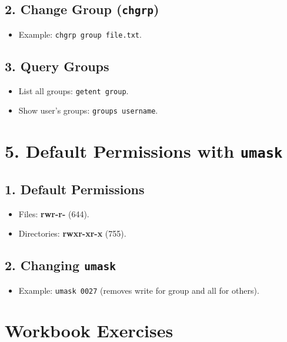 \documentclass[a4paper]{report}
\begin{document}
\subsection*{2. Change Group (\texttt{chgrp})}
\begin{itemize}
    \item Example: \texttt{chgrp group file.txt}.
\end{itemize}

\subsection*{3. Query Groups}
\begin{itemize}
    \item List all groups: \texttt{getent group}.
    \item Show user’s groups: \texttt{groups username}.
\end{itemize}

\section*{5. Default Permissions with \texttt{umask}}

\subsection*{1. Default Permissions}
\begin{itemize}
    \item Files: \textbf{rw\text{-}r\text{-}-r\text{-}-}
    (644).
    \item Directories: \textbf{rwxr-xr-x} (755).
\end{itemize}

\subsection*{2. Changing \texttt{umask}}
\begin{itemize}
    \item Example: \texttt{umask 0027} (removes write for group and all for others).
\end{itemize}

\section*{Workbook Exercises}
\end{document}
